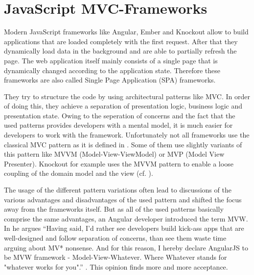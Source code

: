 \section{JavaScript MVC-Frameworks}

Modern JavaScript frameworks like Angular, Ember and Knockout allow to build applications that are loaded completely with the first request. After that they dynamically load data in the background and are able to partially refresh the page. The web application itself mainly consists of a single page that is dynamically changed according to the application state. Therefore these frameworks are also called Single Page Application (SPA) frameworks. 

They try to structure the code by using architectural patterns like MVC.
In order of doing this, they achieve a separation of presentation logic, business logic and presentation state.
Owing to the seperation of concerns and the fact that the used patterns provides developers with a mental model, it is much easier for developers to work with the framework.
Unfortunately not all frameworks use the classical MVC pattern as it is defined in \autocite[]{smalltalk_mvc}.
Some of them use slightly variants of this pattern like MVVM (Model-View-ViewModel) or MVP (Model View Presenter).
Knockout for example uses the MVVM pattern to enable a loose coupling of the domain model and the view (cf.
\autocite{heise_knockout}).
 
The usage of the different pattern variations often lead to discussions of the various advantages and disadvantages of the used pattern and shifted the focus away from the frameworks itself.
But as all of the used patterns basically comprise the same advantages, an Angular developer introduced the term MVW.
In \autocite{anguler_mvw} he argues \enquote{Having said, I'd rather see developers build kick-ass apps that are well-designed and follow separation of concerns, than see them waste time arguing about MV* nonsense.
And for this reason, I hereby declare AngularJS to be MVW framework - Model-View-Whatever.
Where Whatever stands for "whatever works for you".} \autocite[]{anguler_mvw}.
This opinion finds more and more acceptance.

